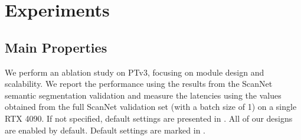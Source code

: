\section{Experiments}
\label{sec:exp}

\subsection{Main Properties}
\label{sec:ablation}
We perform an ablation study on PTv3, focusing on module design and scalability. We report the performance using the  results from the ScanNet semantic segmentation validation and measure the latencies using the  values obtained from the full ScanNet validation set (with a batch size of 1) on a single RTX 4090. If not specified, default settings are presented in . All of our designs are enabled by default. Default settings are marked in .

\begin{table}[t]
    \begin{minipage}{0.48\textwidth}
    \centering
        
        \vspace{-2.5mm}
        \caption{\textbf{Serialization patterns and patch interaction.}  The first column indicates serialization patterns: Z for Z-order, TZ for Trans Z-order, H for Hilbert, and TH for Trans Hilbert. In the first row, S.O. represents Shift Order, which is the default setting also applied to other interaction strategies. S.D. stands for Shift Dilation, and S.P. signifies Shift Patch.}\label{tab:ablation_serialization_interaction}
        \vspace{2mm}
    \end{minipage} \\
    \begin{minipage}{0.48\textwidth}
    \centering
        
        \vspace{-2.5mm}
        \caption{\textbf{Positional encoding.} We compare the proposed CPE+ with APE, RPE, cRPE, and CPE. RPE and CPE are discussed in OctFormer~\cite{Wang2023OctFormer}, while cRPE is deployed by Swin3D~\cite{yang2023swin3d}.}\label{tab:ablation_positional_encoding}
        \vspace{2mm}
    \end{minipage} \\
    \begin{minipage}{0.48\textwidth}
    \centering
        
        \vspace{-2.5mm}
        \caption{\textbf{Patch size.} Leveraging the inherent simplicity and efficiency of our approach, we expand the receptive field of attention well beyond the conventional scope, surpassing sizes used in previous works such as PTv2~\cite{wu2022point}, which adopts a size of 16, and OctFormer~\cite{Wang2023OctFormer}, which uses 24.}\label{tab:ablation_patch_size} 
        \vspace{-5mm}
    \end{minipage}
\end{table}

